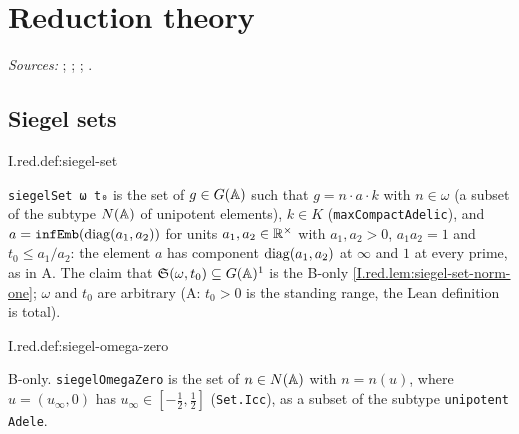 \chapter{Reduction theory}\label{ch:ch-0-08-reduction}

\noindent\emph{Sources:} \cite{Bor-fin}; \cite[§§2, 6]{AIntro}; \cite[§1]{A-R1}; \cite[Lecture II]{Gel}.

\section{Siegel sets}
\begin{definition}
\end{definition}
\begin{tfformal}{I.red.def:siegel-set}
\begin{tffidelity}
\texttt{siegelSet ω t₀} is the set of $g\in G(\mathbb{A})$ such that $g=n\cdot a\cdot k$ with $n\in\omega$ (a subset of the subtype $N(\mathbb{A})$ of unipotent elements), $k\in K$ (\texttt{maxCompactAdelic}), and $a=\texttt{infEmb}(\operatorname{diag}(a_1,a_2))$ for units $a_1,a_2\in\mathbb{R}^\times$ with $a_1,a_2>0$, $a_1a_2=1$ and $t_0\le a_1/a_2$: the element $a$ has component $\operatorname{diag}(a_1,a_2)$ at $\infty$ and $1$ at every prime, as in A. The claim that $\mathfrak S(\omega,t_0)\subseteq G(\mathbb{A})^1$ is the B-only \cref{I.red.lem:siegel-set-norm-one}; $\omega$ and $t_0$ are arbitrary (A: $t_0>0$ is the standing range, the Lean definition is total).
\end{tffidelity}
\end{tfformal}

\begin{definition}
\bonly
{}
\end{definition}
\begin{tfformal}{I.red.def:siegel-omega-zero}
\begin{tffidelity}
B-only. \texttt{siegelOmegaZero} is the set of $n\in N(\mathbb{A})$ with $n=n(u)$, where $u=(u_\infty,0)$ has $u_\infty\in[-\frac12,\frac12]$ (\texttt{Set.Icc}), as a subset of the subtype \texttt{unipotent Adele}.
\end{tffidelity}
\end{tfformal}

